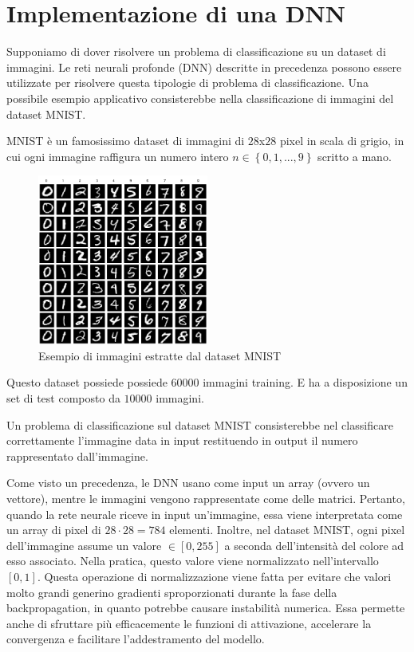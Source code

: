 
\section{Implementazione di una DNN}
Supponiamo di dover risolvere un problema di classificazione su un dataset di 
immagini. Le reti neurali profonde (DNN) descritte in precedenza possono 
essere utilizzate per risolvere questa tipologie di problema di classificazione.
Una possibile esempio applicativo consisterebbe nella classificazione 
di immagini del dataset MNIST.

MNIST è un famosissimo dataset di immagini di $28$x$28$ pixel in 
scala di grigio, in cui ogni immagine raffigura un numero intero 
$n \in \left\{0, 1, ..., 9\right\}$ scritto a mano.

\begin{figure}[H]
    \centering
    \includegraphics[width=0.5\textwidth]{Immagini/Generiche/MNIST_esempio.png}
    \caption{Esempio di immagini estratte dal dataset MNIST}
\end{figure}

Questo dataset possiede possiede $60000$ immagini training. E ha a 
disposizione un set di test composto da $10000$ immagini.

Un problema di classificazione sul dataset MNIST consisterebbe nel 
classificare correttamente l’immagine data in input restituendo in 
output il numero rappresentato dall'immagine.

Come visto un precedenza, le DNN usano come input un array 
(ovvero un vettore), mentre le immagini vengono rappresentate come
delle matrici. Pertanto, quando la rete neurale riceve in input un’immagine, 
essa viene interpretata come un array di pixel di $28 \cdot 28 = 784$ 
elementi.
Inoltre, nel dataset MNIST, ogni pixel dell'immagine assume un valore 
$\in[0, 255]$ a seconda dell’intensità del colore ad esso associato. 
Nella pratica, questo valore viene normalizzato nell'intervallo $[0, 1]$. 
Questa operazione di normalizzazione viene fatta per evitare che 
valori molto grandi generino gradienti sproporzionati durante la fase della
backpropagation, in quanto potrebbe causare instabilità numerica.
Essa permette anche di sfruttare più efficacemente le funzioni di 
attivazione, accelerare la convergenza e facilitare 
l'addestramento del modello.

